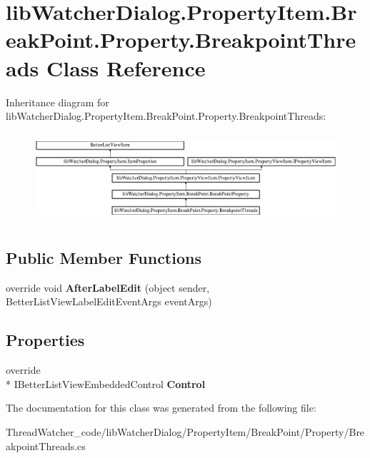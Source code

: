\hypertarget{classlib_watcher_dialog_1_1_property_item_1_1_break_point_1_1_property_1_1_breakpoint_threads}{\section{lib\+Watcher\+Dialog.\+Property\+Item.\+Break\+Point.\+Property.\+Breakpoint\+Threads Class Reference}
\label{classlib_watcher_dialog_1_1_property_item_1_1_break_point_1_1_property_1_1_breakpoint_threads}
}
Inheritance diagram for lib\+Watcher\+Dialog.\+Property\+Item.\+Break\+Point.\+Property.\+Breakpoint\+Threads\+:\begin{figure}[H]
\begin{center}
\leavevmode
\includegraphics[height=3.341289cm]{classlib_watcher_dialog_1_1_property_item_1_1_break_point_1_1_property_1_1_breakpoint_threads}
\end{center}
\end{figure}
\subsection*{Public Member Functions}
\begin{DoxyCompactItemize}
\item 
\hypertarget{classlib_watcher_dialog_1_1_property_item_1_1_break_point_1_1_property_1_1_breakpoint_threads_adace789c31f35970a59f0fba47ec9670}{override void {\bfseries After\+Label\+Edit} (object sender, Better\+List\+View\+Label\+Edit\+Event\+Args event\+Args)}\label{classlib_watcher_dialog_1_1_property_item_1_1_break_point_1_1_property_1_1_breakpoint_threads_adace789c31f35970a59f0fba47ec9670}

\end{DoxyCompactItemize}
\subsection*{Properties}
\begin{DoxyCompactItemize}
\item 
\hypertarget{classlib_watcher_dialog_1_1_property_item_1_1_break_point_1_1_property_1_1_breakpoint_threads_a1e354c813361fadc461a3f04f6a7bd1a}{override \\*
I\+Better\+List\+View\+Embedded\+Control {\bfseries Control}}\label{classlib_watcher_dialog_1_1_property_item_1_1_break_point_1_1_property_1_1_breakpoint_threads_a1e354c813361fadc461a3f04f6a7bd1a}

\end{DoxyCompactItemize}


The documentation for this class was generated from the following file\+:\begin{DoxyCompactItemize}
\item 
Thread\+Watcher\+\_\+code/lib\+Watcher\+Dialog/\+Property\+Item/\+Break\+Point/\+Property/Breakpoint\+Threads.\+cs\end{DoxyCompactItemize}
